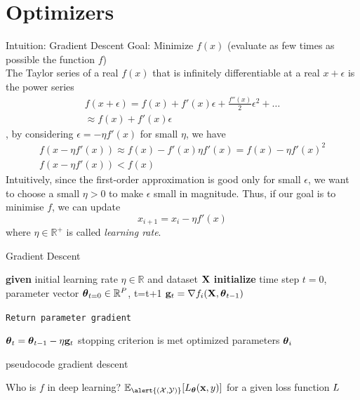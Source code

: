 \documentclass[xcolor=pdftex,dvipsnames,table,mathserif]{beamer}
\begin{document}
\section{Optimizers}

\begin{frame}{Intuition: Gradient Descent \cite{Cauchy47}}
Goal: Minimize $f(x)$ (evaluate \alert{as few times as possible} the function $f$)\\
The Taylor series of a real $f(x)$ that is infinitely differentiable at a real $x+\epsilon$ is the power series
\begin{eqnarray*}
f(x+\epsilon)=f(x)+f'(x)\epsilon+\frac{f''(x)}{2}\epsilon^2+\dots \\
\approx f(x)+f'(x)\epsilon
\end{eqnarray*},
by considering $\epsilon= -\eta f'(x)$ for small $\eta$, we have
\begin{eqnarray*}
f(x- \eta f'(x)) \approx f(x)-f'(x)\eta f'(x) =   f(x)-\eta f'(x)^ 2  \\
f(x-\eta f'(x)) < f(x)
\end{eqnarray*}
Intuitively, since the first-order approximation is good only for small $\epsilon$, we want to choose a small $\eta > 0$ to make $\epsilon$ small in magnitude.
Thus, if our goal is to minimise $f$, we can update
\begin{equation}
x_{i+1}=x_i-\eta f'(x)
\end{equation}
where $\eta \in \mathbb{R}^{+}$ is called \emph{learning rate}.
\end{frame}

\begin{frame}{Gradient Descent \cite{Cauchy47}}
\begin{algorithm}[H]
\begin{algorithmic}[1]
\STATE \textbf{given} initial learning rate $\eta \in \mathbb{R}$ and dataset $\mathbf{X}$
\STATE \textbf{initialize} time step $t=0$, parameter vector $\boldsymbol{\theta}_{t=0} \in \mathbb{R}^P$,
\REPEAT
\STATE t=t+1
\STATE $\mathbf{g}_t = \nabla f_i(\mathbf{X},\boldsymbol{\theta}_{t-1})$  \begin{tiny}\texttt{Return parameter gradient}\end{tiny}
\STATE $\boldsymbol{\theta}_t=\boldsymbol{\theta}_{t-1}  - \eta \mathbf{g}_t$
\UNTIL stopping criterion is met
\RETURN optimized parameters $\boldsymbol{\theta}_i$
\end{algorithmic}
\caption{pseudocode gradient descent }
\label{alg:seq}
\end{algorithm}
Who is $f$ in deep learning? $\mathbb{E}_{\alert{(\mathcal{X},\mathcal{Y})}} [\loss_{\param}(\x,y)]$ for a given loss function $L$ 
\end{frame}
\end{document}
